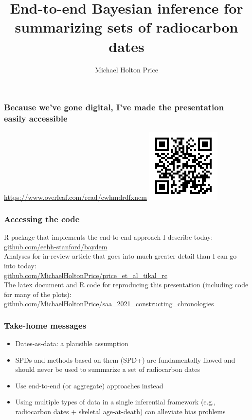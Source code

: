 \documentclass{beamer}
\title[Bayesian Radiocarbon]{End-to-end Bayesian inference for summarizing sets of radiocarbon dates}
\author{Michael Holton Price}
\institute[SFI] {
	Santa Fe Institute\\
	MichaelHoltonPrice@gmail.com\\
	\line(1,0){0}\\
	Society for American Archaeology\\
	22 Mar 2021\\
}
\date{}
\begin{document}
\begin{frame}[plain]
  \titlepage
\end{frame}

\begin{frame}
  \frametitle{Because we've gone digital, I've made the presentation easily accessible}
  \centering
  \href{https://www.overleaf.com/read/cwhmdrdfxncm}{https://www.overleaf.com/read/cwhmdrdfxncm}
  \includegraphics[height=.85\textheight]{QR_Code_1616345765.png}
\end{frame}

\begin{frame}[c]
    \frametitle{Accessing the code}
      R package that implements the end-to-end approach I describe today:\\
      \href{https://github.com/eehh-stanford/baydem}{github.com/eehh-stanford/baydem}\\
      \bigskip
      Analyses for in-review article that goes into much greater detail than I can go into today:\\
      \href{https://github.com/MichaelHoltonPrice/price_et_al_tikal_rc}{github.com/MichaelHoltonPrice/price\_et\_al\_tikal\_rc}\\
      \bigskip
      The latex document and R code for reproducing this presentation (including code for many of the plots):\\
      \href{https://github.com/MichaelHoltonPrice/saa_2021_constructing_chronologies}{github.com/MichaelHoltonPrice/saa\_2021\_constructing\_chronologies}\\
\end{frame}

\begin{frame}[t]
  \frametitle{Take-home messages}
  \pause
  \begin{itemize}
    \item Dates-as-data: a plausible assumption
    \pause
    \item SPDs and methods based on them (SPD+) are fundamentally flawed and should never be used to summarize a set of radiocarbon dates
    \pause
    \item Use end-to-end (or aggregate) approaches instead
    \pause
    \item Using multiple types of data in a single inferential framework (e.g., radiocarbon dates + skeletal age-at-death) can alleviate bias problems
  \end{itemize}
\end{frame}
\end{document}

